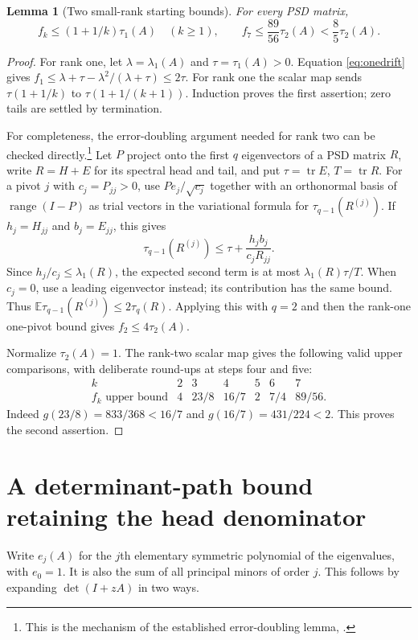 \documentclass[11pt]{article}
\newtheorem{lemma}[theorem]{Lemma}
\theoremstyle{remark}\newtheorem{remark}[theorem]{Remark}
\DeclareMathOperator{\tr}{tr}
\newcommand{\E}{\mathbb E}
\begin{document}
\begin{lemma}[Two small-rank starting bounds]\label{lem:small}
For every PSD matrix,
\begin{equation}
 f_k\le(1+1/k)\tau_1(A)\quad(k\ge1),
 \qquad f_7\le\frac{89}{56}\tau_2(A)<\frac85\tau_2(A). \label{eq:small}
\end{equation}
\end{lemma}
\begin{proof}
For rank one, let $\lambda=\lambda_1(A)$ and $\tau=\tau_1(A)>0$. Equation \eqref{eq:onedrift} gives $f_1\le\lambda+\tau-\lambda^2/(\lambda+\tau)\le2\tau$. For rank one the scalar map sends $\tau(1+1/k)$ to $\tau(1+1/(k+1))$. Induction proves the first assertion; zero tails are settled by termination.

For completeness, the error-doubling argument needed for rank two can be checked directly.\footnote{This is the mechanism of the established error-doubling lemma, \cite[Lemma 5.5]{chen}.} Let $P$ project onto the first $q$ eigenvectors of a PSD matrix $R$, write $R=H+E$ for its spectral head and tail, and put $\tau=\tr E$, $T=\tr R$. For a pivot $j$ with $c_j=P_{jj}>0$, use $Pe_j/\sqrt{c_j}$ together with an orthonormal basis of $\operatorname{range}(I-P)$ as trial vectors in the variational formula for $\tau_{q-1}(R^{(j)})$. If $h_j=H_{jj}$ and $b_j=E_{jj}$, this gives
\[
 \tau_{q-1}(R^{(j)})\le\tau+\frac{h_jb_j}{c_j R_{jj}}.
\]
Since $h_j/c_j\le\lambda_1(R)$, the expected second term is at most $\lambda_1(R)\tau/T$. When $c_j=0$, use a leading eigenvector instead; its contribution has the same bound. Thus $\E\tau_{q-1}(R^{(j)})\le2\tau_q(R)$. Applying this with $q=2$ and then the rank-one one-pivot bound gives $f_2\le4\tau_2(A)$.

Normalize $\tau_2(A)=1$. The rank-two scalar map gives the following valid upper comparisons, with deliberate round-ups at steps four and five:
\[
\begin{array}{c|rrrrrr}
 k&2&3&4&5&6&7\\\hline
 f_k\text{ upper bound}&4&23/8&16/7&2&7/4&89/56.
\end{array}
\]
Indeed $g(23/8)=833/368<16/7$ and $g(16/7)=431/224<2$. This proves the second assertion.
\end{proof}

\section{A determinant-path bound retaining the head denominator}
Write $e_j(A)$ for the $j$th elementary symmetric polynomial of the eigenvalues, with $e_0=1$. It is also the sum of all principal minors of order $j$. This follows by expanding $\det(I+zA)$ in two ways.
\end{document}
